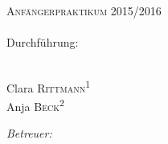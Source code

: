 \begin{titlepage}
	\par
	\hfill
	\par
\begin{center}
\ \\
[5.5cm]	
	\textsc{\Huge Anfängerpraktikum 2015/2016} \\
[1.5cm]
	\Huge\textbf{\Versuch} \\
[1cm]
	{\large Durchführung: \Tag} \\
	{\large \Korrektur} \\
[4.5cm]
\begin{minipage}{0.4\textwidth}
	\begin{flushleft} \large
		Clara \textsc{Rittmann}\textsuperscript{1} \\
		Anja \textsc{Beck}\textsuperscript{2}
	\end{flushleft}
\end{minipage}
\hfill
\begin{minipage}{0.4\textwidth}
	\begin{flushright} \large
		\emph{Betreuer:} \\
		\Betreuer
	\end{flushright}
\end{minipage}
\end{center}
\end{titlepage}